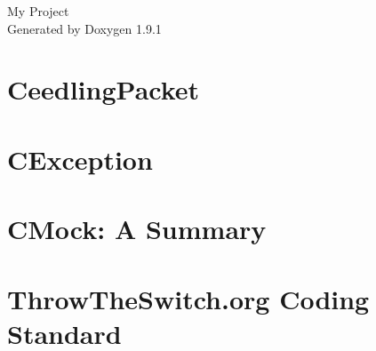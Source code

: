 \let\mypdfximage\pdfximage\def\pdfximage{\immediate\mypdfximage}\documentclass[twoside]{book}
\newcommand{\+}{\discretionary{\mbox{\scriptsize$\hookleftarrow$}}{}{}}
\newcommand{\clearemptydoublepage}{%
  \newpage{\pagestyle{empty}\cleardoublepage}%
}
\begin{document}
\raggedbottom

\hypersetup{pageanchor=false,
             bookmarksnumbered=true,
             pdfencoding=unicode
            }
\begin{titlepage}
\vspace*{7cm}
\begin{center}%
{\Large My Project }\\
\vspace*{1cm}
{\large Generated by Doxygen 1.9.1}\\
\end{center}
\end{titlepage}
\clearemptydoublepage
{}
\tableofcontents
\clearemptydoublepage
{}
\hypersetup{pageanchor=true}

\chapter{Ceedling\+Packet}
\label{md__c__mpb_component_mpb_digital_filtering__unit_test_framework_vendor_ceedling_docs__ceedling_packet}

\chapter{CException}
\label{md__c__mpb_component_mpb_digital_filtering__unit_test_framework_vendor_ceedling_docs__c_exception}

\chapter{CMock\+: A Summary}
\label{md__c__mpb_component_mpb_digital_filtering__unit_test_framework_vendor_ceedling_docs__c_mock__summary}

\chapter{Throw\+The\+Switch.\+org Coding Standard}
\label{md__c__mpb_component_mpb_digital_filtering__unit_test_framework_vendor_ceedling_docs__throw_the_switch_coding_standard}

\end{document}
